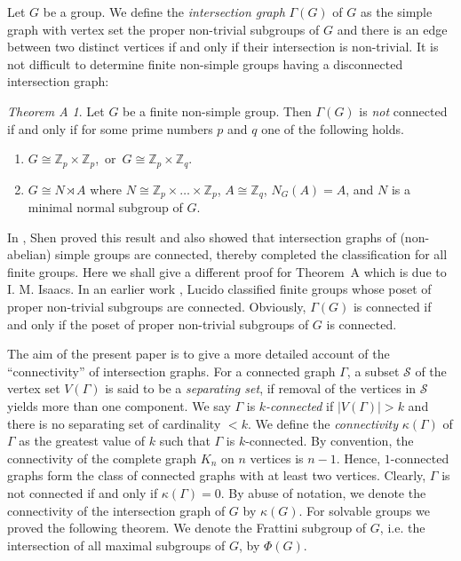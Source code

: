 \documentclass[a4paper,12pt]{article}
\theoremstyle{definition}
\theoremstyle{remark}
\theoremstyle{theorem}
\newtheorem*{theoremA}{Theorem A}
\begin{document}
Let $G$ be a group. We define the \emph{intersection graph} $\Gamma(G)$ of $G$ as the simple graph with vertex set the proper non-trivial subgroups of $G$ and there is an edge between two distinct vertices if and only if their intersection is non-trivial. It is not difficult to determine finite non-simple groups having a disconnected intersection graph:

\begin{theoremA}
  Let $G$ be a finite non-simple group. Then $\Gamma(G)$ is \emph{not} connected if and only if for some prime numbers $p$ and $q$ one of the following holds.
  \begin{enumerate}
  \item $G\cong\mathbb{Z}_p\times\mathbb{Z}_p$,\, or\,
    $G\cong\mathbb{Z}_p\times\mathbb{Z}_q$.
  \item $G\cong N\rtimes A$ where
    $N\cong \mathbb{Z}_p\times\dots\times\mathbb{Z}_p$,
    $A\cong\mathbb{Z}_q$, $N_G(A)=A$, and $N$ is a minimal
    normal subgroup of $G$.
  \end{enumerate}
\end{theoremA}

In \cite{Shen2010}, Shen proved this result and also showed that intersection graphs of (non-abelian) simple groups are connected, thereby completed the classification for all finite groups. Here we shall give a different proof for Theorem~A which is due to I. M. Isaacs. In an earlier work \cite{Lucido2003}, Lucido classified finite groups whose poset of proper non-trivial subgroups are connected. Obviously, $\Gamma(G)$ is connected if and only if the poset of proper non-trivial subgroups of $G$ is connected.

The aim of the present paper is to give a more detailed account of the ``connectivity'' of intersection graphs. For a connected graph $\Gamma$, a subset $\mathcal{S}$ of the vertex set $V(\Gamma)$ is said to be a \emph{separating set}, if removal of the vertices in $\mathcal{S}$ yields more than one component. We say $\Gamma$ is \emph{$k$-connected} if $|V(\Gamma)|>k$ and there is no separating set of cardinality $<k$. We define the \emph{connectivity} $\kappa(\Gamma)$ of $\Gamma$ as the greatest value of $k$ such that $\Gamma$ is $k$-connected. By convention, the connectivity of the complete graph $K_n$ on $n$ vertices is $n-1$. Hence, $1$-connected graphs form the class of connected graphs with at least two vertices. Clearly, $\Gamma$ is not connected if and only if $\kappa(\Gamma)=0$.
By abuse of notation, we denote the connectivity of the intersection graph of $G$ by $\kappa(G)$. For solvable groups we proved the following theorem. We denote the Frattini subgroup of $G$, i.e. the intersection of all maximal subgroups of $G$, by $\Phi(G)$.
\end{document}
